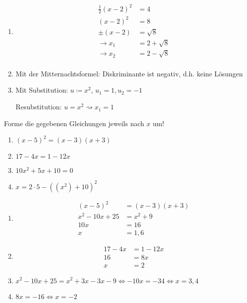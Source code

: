 \begin{lsg}{}
  \begin{multicols}{3}
    \begin{enumerate}
      \item \begin{align*}
        \frac 1 2 (x-2)^2 &= 4\\
        (x-2)^2 &= 8\\
        \pm(x-2)&=\sqrt 8\\
        \rightarrow x_1&=2+\sqrt 8\\
        \rightarrow x_2&=2-\sqrt 8\\
      \end{align*}
      \columnbreak
      \item Mit der Mitternachtsformel: Diskriminante ist negativ, d.h. keine Lösungen
      \columnbreak
      \item Mit Substitution: $u\coloneqq x^2$, $u_1=1, u_2=-1$

			Resubstitution: $u=x^2 \rightsquigarrow x_1=1$
    \end{enumerate}
  \end{multicols}
\end{lsg}


Forme die gegebenen Gleichungen jeweils nach $x$ um!
\begin{multicols}{2}
	\begin{enumerate}
		\item $(x-5)^2=(x-3)(x+3)$
		\item $17-4x=1-12x$
		\item $10x^2+5x+10 = 0$
		\item $x=2\cdot 5-((x^2)+10)^2$
	\end{enumerate}
\end{multicols}

\begin{lsg}{}
	\begin{enumerate}
		\item \begin{align*}
			(x-5)^2 &= (x-3)(x+3)\\
			x^2-10x+25 &= x^2+9\\
			10x &= 16\\
			x &= 1,6
		\end{align*}
		\item \begin{align*}
			17-4x &= 1-12x\\
			16 &= 8x\\
			x &= 2
		\end{align*}
		\item $x^2-10x+25=x^2+3x-3x-9 \Leftrightarrow -10x=-34 \Leftrightarrow x=3,4$
		\item $8x=-16 \Leftrightarrow x=-2$
	\end{enumerate}
\end{lsg}


